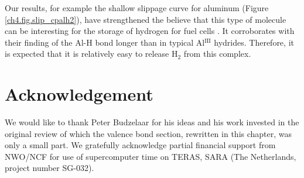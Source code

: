 Our results, for example the shallow slippage curve for aluminum (Figure \ref{ch4.fig.slip_cpalh2}), have strengthened the believe that this type of molecule can be interesting for the storage of hydrogen for fuel cells \cite{himmel}. It corroborates with their finding of the Al-H bond longer than in typical Al$^{\textrm{III}}$ hydrides. Therefore, it is expected that it is relatively easy to release H$_2$ from this complex.

\section*{Acknowledgement}
We would like to thank Peter Budzelaar for his ideas and his work invested in the original review \cite{budzelaar} of which the valence bond section, rewritten in this chapter, was only a small part. We gratefully acknowledge partial financial support from NWO/NCF for use of supercomputer time on TERAS, SARA (The Netherlands, project number SG-032).  




